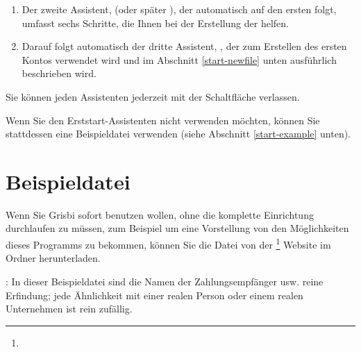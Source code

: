 \begin{enumerate}[resume]
	\item Der zweite Assistent,  (oder später ), der automatisch auf den ersten folgt, umfasst sechs Schritte, die Ihnen bei der Erstellung der  helfen.%
	\item Darauf folgt automatisch der dritte Assistent, , der zum Erstellen des ersten Kontos verwendet wird und im Abschnitt \ref{start-newfile} unten ausführlich beschrieben wird.%
\end{enumerate}

Sie können jeden Assistenten jederzeit mit der Schaltfläche  verlassen.

Wenn Sie den Erststart-Assistenten nicht verwenden möchten, können Sie stattdessen eine Beispieldatei verwenden (siehe Abschnitt \ref{start-example} unten).

\section{Beispieldatei\label{start-example}}

Wenn Sie Grisbi sofort benutzen wollen, ohne die komplette Einrichtung durchlaufen zu müssen, zum Beispiel um eine Vorstellung von den Möglichkeiten dieses Programms zu bekommen, können Sie die Datei  von der \footnote{\urlSourceForgeDocumentation{}} Website im Ordner  herunterladen.

\Note{}: In dieser Beispieldatei sind die Namen der Zahlungsempfänger usw. reine Erfindung; jede Ähnlichkeit mit einer realen Person oder einem realen Unternehmen ist rein zufällig.%

